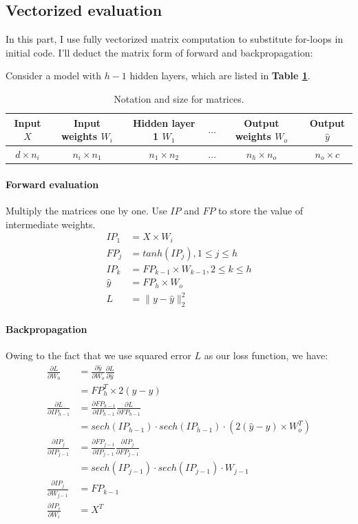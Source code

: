 \documentclass{article}
\begin{document}
\subsection{Vectorized evaluation}

In this part, I use fully vectorized matrix computation to substitute for-loops in initial code. I'll deduct the matrix form of forward and backpropagation:\par

Consider a model with $h-1$ hidden layers, which are listed in \textbf{Table \ref{tab1}}.

\begin{table}[H]
	\centering
	\caption{Notation and size for matrices.}
	\label{tab1}
	\begin{tabular}{cccccc}
	\toprule
	Input $X$& Input weights $W_i$& Hidden layer 1 $W_1$& $\dots$ &Output weights $W_o$& Output $\hat{y}$\\
	\midrule
	$d\times{n_i}$& $n_i\times{n_1}$& $n_1\times{n_2}$& $\dots$& $n_h\times{n_o}$& $n_o\times{c}$\\
	\bottomrule
	\end{tabular}
\end{table}

\paragraph{Forward evaluation}
Multiply the matrices one by one. Use $IP$ and $FP$ to store the value of intermediate weights.
\[
\begin{aligned}
IP_1&=X\times W_i\\
FP_j&=tanh(IP_j),  1\le{j}\le{h}\\
IP_k&=FP_{k-1}\times W_{k-1},  2\le{k}\le{h}\\
\hat{y}&=FP_{h}\times W_o\\
L&=\|y-\hat{y}\|_2^2
\end{aligned}
\]

\paragraph{Backpropagation}
Owing to the fact that we use squared error $L$ as our loss function, we have:
\[
\begin{aligned}
\frac{\partial L}{\partial W_0}
&=\frac{\partial \hat{y}}{\partial W_o}\frac{\partial L}{\partial \hat{y}}\\
&=FP^T_h\times 2(\hat{y}-y)\\
\frac{\partial{L}}{\partial{IP_{h-1}}}
&=\frac{\partial{FP_{h-1}}}{\partial{IP_{h-1}}}\frac{\partial{L}}{\partial{FP_{h-1}}}\\
&=sech(IP_{h-1})\cdot sech(IP_{h-1})\cdot(2(\hat{y}-y)\times W_o^T)\\
\frac{\partial{IP_j}}{\partial{IP_{j-1}}}
&=\frac{\partial{FP_{j-1}}}{\partial{IP_{j-1}}}\frac{\partial{IP_j}}{\partial{FP_{j-1}}}\\
&=sech(IP_{j-1}) \cdot sech(IP_{j-1})\cdot W_{j-1}\\
\frac{\partial{IP_j}}{\partial{W_{j-1}}}
&=FP_{k-1}\\
\frac{\partial IP_i}{\partial W_i}
&=X^T\\
\end{aligned}
\]
\end{document}
